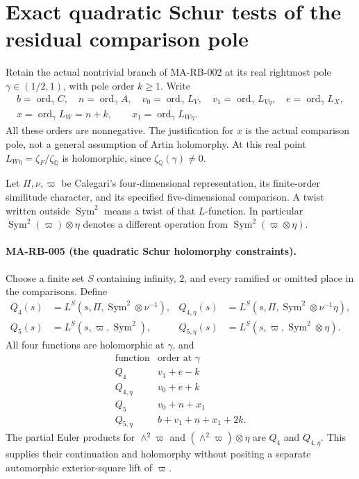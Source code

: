 \section{Exact quadratic Schur tests of the residual comparison pole}
\label{sec:s5-quadratic-schur}

Retain the actual nontrivial branch of MA-RB-002 at its real
rightmost pole \(\gamma\in(1/2,1)\), with pole order \(k\ge1\).
Write
\[
 \begin{gathered}
 b=\operatorname{ord}_\gamma C,\quad
 n=\operatorname{ord}_\gamma A,\quad
 v_0=\operatorname{ord}_\gamma L_V,\quad
 v_1=\operatorname{ord}_\gamma L_{V\eta},\quad
 e=\operatorname{ord}_\gamma L_X,\\
 x=\operatorname{ord}_\gamma L_W=n+k,\qquad
 x_1=\operatorname{ord}_\gamma L_{W\eta}.
 \end{gathered}
 \tag{MA-RB.46}
\]
All these orders are nonnegative. The justification for \(x\)
is the actual comparison pole, not a general assumption of
Artin holomorphy. At this real point
\(L_{W\eta}=\zeta_F/\zeta_{\mathbb Q}\) is holomorphic, since
\(\zeta_{\mathbb Q}(\gamma)\ne0\).

Let \(\Pi,\nu,\varpi\) be Calegari's four-dimensional
representation, its finite-order similitude character, and its
specified five-dimensional comparison. A twist written outside
\(\operatorname{Sym}^2\) means a twist of that \(L\)-function.
In particular \(\operatorname{Sym}^2(\varpi)\otimes\eta\)
denotes a different operation from
\(\operatorname{Sym}^2(\varpi\otimes\eta)\).

\paragraph{MA-RB-005 (the quadratic Schur holomorphy constraints).}
Choose a finite set \(S\) containing infinity, \(2\), and every
ramified or omitted place in the comparisons. Define
\[
 \begin{aligned}
 Q_4(s)&=L^S(s,\Pi,\operatorname{Sym}^2\otimes\nu^{-1}),&
 Q_{4,\eta}(s)&=L^S(s,\Pi,\operatorname{Sym}^2
                                      \otimes\nu^{-1}\eta),\\
 Q_5(s)&=L^S(s,\varpi,\operatorname{Sym}^2),&
 Q_{5,\eta}(s)&=L^S(s,\varpi,\operatorname{Sym}^2\otimes\eta).
 \end{aligned}
 \tag{MA-RB.47}
\]
All four functions are holomorphic at \(\gamma\), and
\[
 \begin{array}{c|c}
 \text{function}&\text{order at }\gamma\\ \hline
 Q_4&v_1+e-k\\
 Q_{4,\eta}&v_0+e+k\\
 Q_5&v_0+n+x_1\\
 Q_{5,\eta}&b+v_1+n+x_1+2k .
 \end{array}
 \tag{MA-RB.48}
\]
The partial Euler products for \(\wedge^2\varpi\)
and \((\wedge^2\varpi)\otimes\eta\) are \(Q_4\) and
\(Q_{4,\eta}\). This supplies their continuation and
holomorphy without positing a separate automorphic
exterior-square lift of \(\varpi\).

